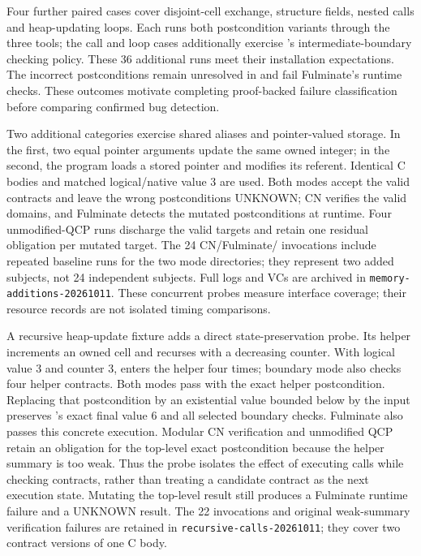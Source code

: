 Four further paired cases cover disjoint-cell exchange, structure fields,
nested calls and heap-updating loops. Each runs both postcondition variants
through the three tools; the call and loop cases additionally exercise
\tespec{}'s intermediate-boundary checking policy. These 36 additional runs
meet their installation expectations. The incorrect postconditions remain
unresolved in \tespec{} and fail Fulminate's runtime checks. These outcomes
motivate completing proof-backed failure classification before comparing
confirmed bug detection.

Two additional categories exercise shared aliases and pointer-valued storage.
In the first, two equal pointer arguments update the same owned integer; in
the second, the program loads a stored pointer and modifies its referent.
Identical C bodies and matched logical/native value 3 are used. Both \tespec{}
modes accept the valid contracts and leave the wrong postconditions UNKNOWN;
CN verifies the valid domains, and Fulminate detects the mutated postconditions
at runtime. Four unmodified-QCP runs discharge the valid targets and retain
one residual obligation per mutated target. The 24 CN/Fulminate/\tespec{}
invocations include repeated baseline runs for the two mode directories;
they represent two added subjects, not 24 independent subjects. Full logs and
VCs are archived in \texttt{memory-additions-20261011}. These concurrent probes
measure interface coverage; their resource records are not isolated timing
comparisons.

A recursive heap-update fixture adds a direct state-preservation probe. Its
helper increments an owned cell and recurses with a decreasing counter. With
logical value 3 and counter 3, \tespec{} enters the helper four times; boundary
mode also checks four helper contracts. Both modes pass with the exact helper
postcondition. Replacing that postcondition by an existential value bounded
below by the input preserves \tespec{}'s exact final value 6 and all selected
boundary checks. Fulminate also passes this concrete execution. Modular CN
verification and unmodified QCP retain an obligation for the top-level exact
postcondition because the helper summary is too weak. Thus the probe isolates
the effect of executing calls while checking contracts, rather than treating a
candidate contract as the next execution state. Mutating the top-level result
still produces a Fulminate runtime failure and a \tespec{} UNKNOWN result.
The 22 invocations and original weak-summary verification failures are retained
in \texttt{recursive-calls-20261011}; they cover two contract versions of one
C body.

